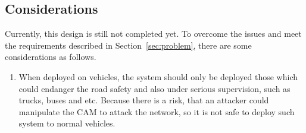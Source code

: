 \subsection{Considerations}

Currently, this design is still not completed yet.
To overcome the issues and meet the requirements described in Section~\ref{sec:problem},
there are some considerations as follows.
\begin{enumerate}
\item When deployed on vehicles,
    the system should only be deployed those which could endanger the road safety and also under serious supervision,
    such as trucks, buses and etc.
    Because there is a risk, that an attacker could manipulate the CAM to attack the network,
    so it is not safe to deploy such system to normal vehicles.
\end{enumerate}